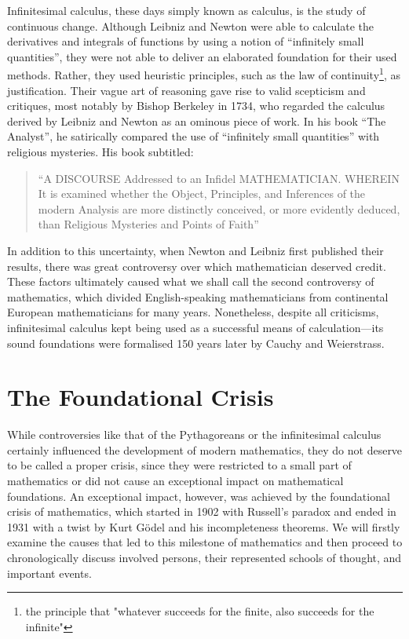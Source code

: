 \documentclass{article}
\begin{document}
Infinitesimal calculus, these days simply known as calculus, is the study of continuous change. Although Leibniz and Newton were able to calculate the derivatives and integrals of functions by using a notion of ``infinitely small quantities'', they were not able to deliver an elaborated foundation for their used methods. Rather, they used heuristic principles, such as the law of continuity\footnote{the principle that "whatever succeeds for the finite, also succeeds for the infinite"}, as justification. Their vague art of reasoning gave rise to valid scepticism and critiques, most notably by Bishop Berkeley in 1734, who regarded the calculus derived by Leibniz and Newton as an ominous piece of work. In his book ``The Analyst'', he satirically compared the use of ``infinitely small quantities'' with religious mysteries. His book subtitled:
\begin{quote}
``A DISCOURSE Addressed to an Infidel MATHEMATICIAN\@. WHEREIN It is examined whether the Object, Principles, and Inferences of the modern Analysis are more distinctly conceived, or more evidently deduced, than Religious Mysteries and Points of Faith''
\end{quote}
In addition to this uncertainty, when Newton and Leibniz first published their results, there was great controversy over which mathematician deserved credit. These factors ultimately caused what we shall call the second controversy of mathematics, which divided English-speaking mathematicians from continental European mathematicians for many years. None\-theless, despite all criticisms, infinitesimal calculus kept being used as a successful means of calculation---its sound foundations were formalised 150 years later by Cauchy and Weierstrass.

\section{The Foundational Crisis}
While controversies like that of the Pythagoreans or the infinitesimal calculus certainly influenced the development of modern mathematics, they do not deserve to be called a proper crisis, since they were restricted to a small part of mathematics or did not cause an exceptional impact on mathematical foundations. An exceptional impact, however, was achieved by the foundational crisis of mathematics, which started in 1902 with Russell's paradox and ended in 1931 with a twist by Kurt Gödel and his incompleteness theorems.
We will firstly examine the causes that led to this milestone of mathematics and then proceed to chronologically discuss involved persons, their represented schools of thought, and important events.
\end{document}
